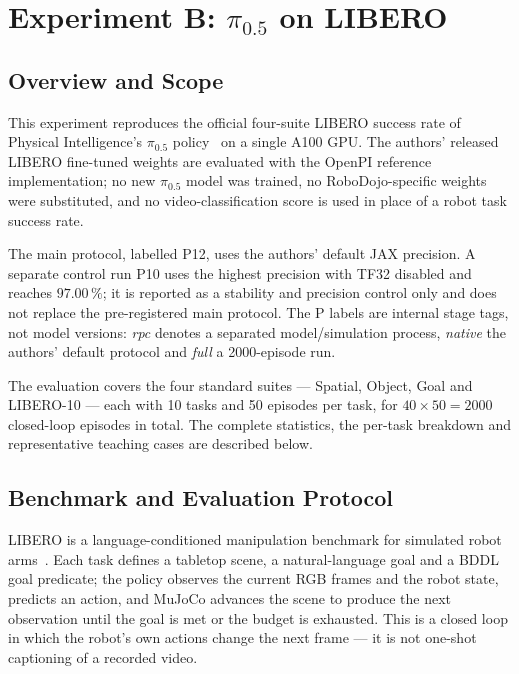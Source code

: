 
\section{Experiment B: \texorpdfstring{$\pi_{0.5}$}{pi-0.5} on LIBERO}
\label{sec:pi05}

\subsection{Overview and Scope}
\label{sec:pi05-overview}

This experiment reproduces the official four-suite LIBERO success rate of
Physical Intelligence's \emph{$\pi_{0.5}$} policy~\cite{pi05_2025} on a single
A100 GPU. The authors' released LIBERO fine-tuned weights are evaluated with
the OpenPI reference implementation; no new $\pi_{0.5}$ model was trained, no
RoboDojo-specific weights were substituted, and no video-classification score
is used in place of a robot task success rate.

The main protocol, labelled P12, uses the authors' default JAX precision. A
separate control run P10 uses the highest precision with TF32 disabled and
reaches $97.00\,\%$; it is reported as a stability and precision control only
and does not replace the pre-registered main protocol. The P labels are internal
stage tags, not model versions: \emph{rpc} denotes a separated
model/simulation process, \emph{native} the authors' default protocol and
\emph{full} a 2000-episode run.

The evaluation covers the four standard suites --- Spatial, Object, Goal and
LIBERO-10 --- each with 10 tasks and 50 episodes per task, for
$40 \times 50 = 2000$ closed-loop episodes in total. The complete statistics,
the per-task breakdown and representative teaching cases are described below.

\subsection{Benchmark and Evaluation Protocol}
\label{sec:pi05-benchmark}

LIBERO is a language-conditioned manipulation benchmark for simulated robot
arms~\cite{libero2023}. Each task defines a tabletop scene, a natural-language
goal and a BDDL goal predicate; the policy observes the current RGB frames and
the robot state, predicts an action, and MuJoCo advances the scene to produce
the next observation until the goal is met or the budget is exhausted. This is a
closed loop in which the robot's own actions change the next frame --- it is not
one-shot captioning of a recorded video.

